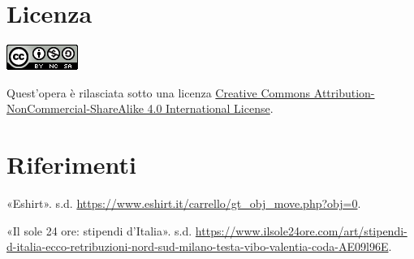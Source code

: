 \documentclass[12pt,italian,]{report}
\begin{document}
\hypertarget{licenza}{%
\chapter{Licenza}\label{licenza}}

\includegraphics{img/licenza.png}

Quest'opera è rilasciata sotto una licenza
\href{https://creativecommons.org/licenses/by-nc-sa/4.0/}{Creative
Commons Attribution-NonCommercial-ShareAlike 4.0 International License}.

\hypertarget{riferimenti}{%
\chapter*{Riferimenti}\label{riferimenti}}

\hypertarget{refs}{}
\leavevmode\hypertarget{ref-eshirt}{}%
«Eshirt». s.d.
\url{https://www.eshirt.it/carrello/gt_obj_move.php?obj=0}.

\leavevmode\hypertarget{ref-redditomedio}{}%
«Il sole 24 ore: stipendi d'Italia». s.d.
\url{https://www.ilsole24ore.com/art/stipendi-d-italia-ecco-retribuzioni-nord-sud-milano-testa-vibo-valentia-coda-AE09l96E}.
\end{document}
